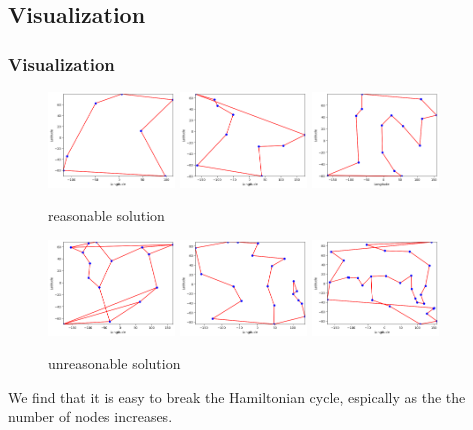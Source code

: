 \documentclass[
	11pt, %
]{beamer}
\begin{document}
\subsection{Visualization}
\begin{frame}
\frametitle{Visualization}
\begin{figure}[!ht]
    \centering
    \includegraphics[width=0.3\textwidth]{assets/tsp7.png}
    \includegraphics[width=0.3\textwidth]{assets/tsp-10.png}
    \includegraphics[width=0.3\textwidth]{assets/tsp-15-works.png}
    \caption{reasonable solution}
    \label{fig:TSP Graph}
\end{figure}
\begin{figure}[!ht]
    \centering
    \includegraphics[width=0.3\textwidth]{assets/tsp-15.png}
    \includegraphics[width=0.3\textwidth]{assets/tsp-20.png}
    \includegraphics[width=0.3\textwidth]{assets/tsp-30.png}
    \caption{unreasonable solution}
    \label{fig:TSP Graph 2}
\end{figure}


We find that it is easy to break the Hamiltonian cycle, espically as the the number of nodes increases.
\end{frame}
\end{document}
